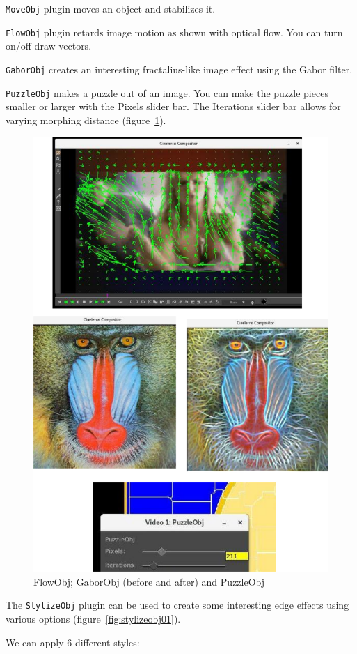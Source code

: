 \texttt{MoveObj} plugin moves an object and stabilizes it.

\texttt{FlowObj} plugin retards image motion as shown with optical flow. You can turn on/off draw vectors.

\texttt{GaborObj} creates an interesting fractalius-like image effect using the Gabor filter.

\texttt{PuzzleObj} makes a puzzle out of an image. You can make the puzzle pieces smaller or larger with the Pixels slider bar. The Iterations slider bar allows for varying morphing distance (figure~\ref{fig:opencv}).

\begin{figure}[htpb]
    \centering
    \includegraphics[width=0.8\linewidth]{images/opencv.png}
    \caption{FlowObj; GaborObj (before and after) and PuzzleObj}
    \label{fig:opencv}
\end{figure}

The \texttt{StylizeObj} plugin can be used to create some interesting edge effects using various options (figure~\ref{fig:stylizeobj01}).

We can apply 6 different styles:

